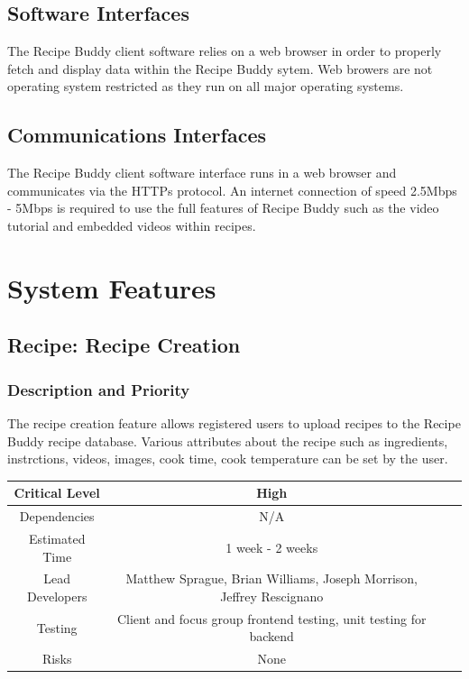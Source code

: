 \documentclass{scrreprt}
\begin{document}
\section{Software Interfaces}
The \gls{Recipe Buddy} client software relies on a web browser in order to properly fetch and display data within the \gls{Recipe Buddy} sytem. Web browers are not operating system restricted as they run on all major operating systems.

\section{Communications Interfaces}
The \gls{Recipe Buddy} client software interface runs in a web browser and communicates via the \gls{HTTPs} protocol. An internet connection of speed 2.5Mbps - 5Mbps is required to use the full features of \gls{Recipe Buddy} such as the video tutorial and embedded videos within recipes.

\chapter{System Features}

\section{Recipe: Recipe Creation}

\subsection{Description and Priority}

The recipe creation feature allows registered users to upload recipes to the \gls{Recipe Buddy} recipe database. Various attributes about the recipe such as ingredients, instrctions, videos, images, cook time, cook temperature can be set by the user.

\begin{center}
    \begin{tabular}{| c | c | c | c |}
        \hline
        Critical Level  & High                                                                 \\
        \hline
        Dependencies    & N/A                                                                  \\
        \hline
        Estimated Time  & 1 week - 2 weeks                                                     \\
        \hline
        Lead Developers & Matthew Sprague, Brian Williams, Joseph Morrison, Jeffrey Rescignano \\
        \hline
        Testing         & Client and focus group frontend testing, unit testing for backend    \\
        \hline
        Risks           & None                                                                 \\
        \hline
    \end{tabular}
\end{center}
\end{document}
